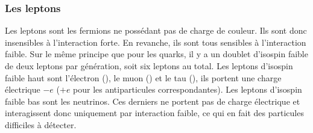 \subsubsection{Les leptons}\label{chapter-MS-MSSM-section-SM_ptcs-subsec-fermions-subsubsec-leptons}
Les leptons sont les fermions ne possédant pas de charge de couleur. Ils sont donc insensibles à l'interaction forte. En revanche, ils sont tous sensibles à l'interaction faible.
Sur le même principe que pour les quarks, il y a un doublet d'isospin faible de deux leptons par génération, soit six leptons au total.
Les leptons d'isospin faible haut sont l'électron (\electron), le muon (\muon) et le tau (\leptau), ils portent une charge électrique $-e$ ($+e$ pour les antiparticules correspondantes). Les leptons d'isospin faible bas sont les neutrinos. Ces derniers ne portent pas de charge électrique et interagissent donc uniquement par interaction faible, ce qui en fait des particules difficiles à détecter.


